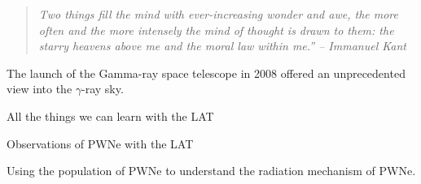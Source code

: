
\begin{quote}
\em{Two things fill the mind with ever-increasing wonder and awe,
the more often and the more intensely the mind of thought is drawn to
them: the starry heavens above me and the moral law within me.'' -- Immanuel Kant}
\end{quote}

The launch of the \fermi Gamma-ray space telescope in 2008 offered
an unprecedented view into the $\gamma$-ray sky.

All the things we can learn with the LAT

Observations of PWNe with the LAT

Using the population of PWNe to understand the radiation mechanism of PWNe.
